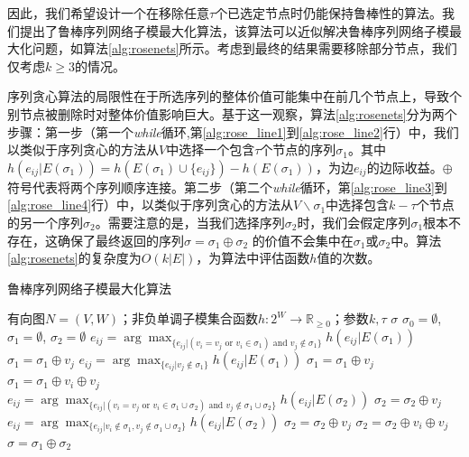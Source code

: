 因此，我们希望设计一个在移除任意$\tau$个已选定节点时仍能保持鲁棒性的算法。我们提出了鲁棒序列网络子模最大化算法，该算法可以近似解决鲁棒序列网络子模最大化问题，如算法\ref{alg:rosenets}所示。考虑到最终的结果需要移除部分节点，我们仅考虑$k \ge 3$的情况。

序列贪心算法的局限性在于所选序列的整体价值可能集中在前几个节点上，导致个别节点被删除时对整体价值影响巨大。基于这一观察，算法\ref{alg:rosenets}分为两个步骤：第一步（第一个\textit{while}循环,第\ref{alg:rose_line1}到\ref{alg:rose_line2}行）中，我们以类似于序列贪心的方法从\(V\)中选择一个包含\(\tau\)个节点的序列\(\sigma_1\)。其中$h(e_{ij}|E(\sigma_1))=h(E(\sigma_1)\cup\{e_{ij}\})-h(E(\sigma_1))$，为边$e_{ij}$的边际收益。$\oplus$符号代表将两个序列顺序连接。第二步（第二个\textit{while}循环，第\ref{alg:rose_line3}到\ref{alg:rose_line4}行）中，以类似于序列贪心的方法从\(V\backslash \sigma_1\)中选择包含\(k-\tau\)个节点的另一个序列\(\sigma_2\)。需要注意的是，当我们选择序列\(\sigma_2\)时，我们会假定序列\(\sigma_1\)根本不存在，这确保了最终返回的序列\(\sigma = \sigma_1 \oplus \sigma_2\) 的价值不会集中在\(\sigma_1\)或\(\sigma_2\)中。算法\ref{alg:rosenets}的复杂度为\(O(k|E|)\)，为算法中评估函数$h$值的次数。

\begin{algorithm}[H]
    \caption{鲁棒序列网络子模最大化算法 \label{alg:rosenets}}
    \begin{algorithmic}[1]
        \REQUIRE 有向图\(N = (V,W)\)；非负单调子模集合函数\(h: 2^W \rightarrow \mathbb{R}_{\ge 0}\)；参数$k, \tau$
        \ENSURE $\sigma$
        \STATE $\sigma_0=\emptyset$, $\sigma_1=\emptyset$, $\sigma_2=\emptyset$\;
         \label{alg:rose_line1}
                \STATE$e_{ij}=\arg\max_{\{e_{ij}|(v_i=v_j \text{ or } v_i \in \sigma_1) \text{ and } v_j\notin \sigma_1\}} h(e_{ij}|E(\sigma_1))$\;
                \STATE$\sigma_1 = \sigma_1 \oplus v_j$\;
            \ELSE
                \STATE $e_{ij}=\arg\max_{\{e_{ij}|v_j\notin \sigma_1\}} h(e_{ij}|E(\sigma_1))$\;
                    \STATE $\sigma_1 = \sigma_1 \oplus v_j$\;
                \ELSE
                    \STATE $\sigma_1 = \sigma_1 \oplus v_i \oplus v_j$\;
                \ENDIF
            \ENDIF
        \ENDWHILE \label{alg:rose_line2}
         \label{alg:rose_line3}
                \STATE $e_{ij}=\arg\max_{\{e_{ij}|(v_i=v_j \text{ or } v_i \in \sigma_1 \cup \sigma_2) \text{ and } v_j \notin \sigma_1 \cup \sigma_2\}} h(e_{ij}|E(\sigma_2))$\;
                \STATE $\sigma_2 = \sigma_2 \oplus v_j$\;
            \ELSE
                \STATE $e_{ij}=\arg\max_{\{e_{ij}|v_i\notin \sigma_1, v_j \notin \sigma_1 \cup \sigma_2\}} h(e_{ij}|E(\sigma_2))$\;
                    \STATE$\sigma_2 = \sigma_2 \oplus v_j$\;
                \ELSE
                    \STATE $\sigma_2 = \sigma_2 \oplus v_i \oplus v_j$\;
                \ENDIF
            \ENDIF
        \ENDWHILE \label{alg:rose_line4}
        \STATE $\sigma=\sigma_1\oplus \sigma_2$\;
    \end{algorithmic}
\end{algorithm}


